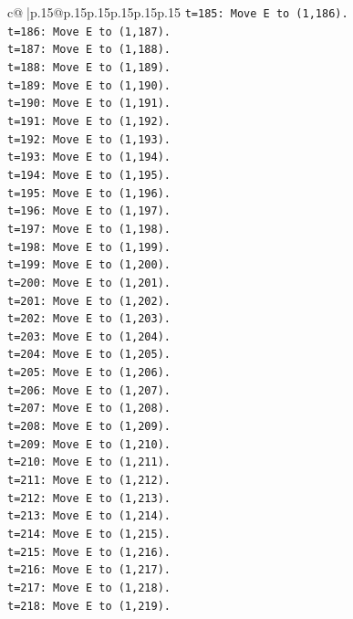 \documentclass{article}
\begin{document}
{\begin{supertabular}{c@{$\;$}|p{.15\linewidth}@{}p{.15\linewidth}p{.15\linewidth}p{.15\linewidth}p{.15\linewidth}p{.15\linewidth}}
{{{\texttt{t=185: Move E to (1,186).} \\
\texttt{t=186: Move E to (1,187).} \\
\texttt{t=187: Move E to (1,188).} \\
\texttt{t=188: Move E to (1,189).} \\
\texttt{t=189: Move E to (1,190).} \\
\texttt{t=190: Move E to (1,191).} \\
\texttt{t=191: Move E to (1,192).} \\
\texttt{t=192: Move E to (1,193).} \\
\texttt{t=193: Move E to (1,194).} \\
\texttt{t=194: Move E to (1,195).} \\
\texttt{t=195: Move E to (1,196).} \\
\texttt{t=196: Move E to (1,197).} \\
\texttt{t=197: Move E to (1,198).} \\
\texttt{t=198: Move E to (1,199).} \\
\texttt{t=199: Move E to (1,200).} \\
\texttt{t=200: Move E to (1,201).} \\
\texttt{t=201: Move E to (1,202).} \\
\texttt{t=202: Move E to (1,203).} \\
\texttt{t=203: Move E to (1,204).} \\
\texttt{t=204: Move E to (1,205).} \\
\texttt{t=205: Move E to (1,206).} \\
\texttt{t=206: Move E to (1,207).} \\
\texttt{t=207: Move E to (1,208).} \\
\texttt{t=208: Move E to (1,209).} \\
\texttt{t=209: Move E to (1,210).} \\
\texttt{t=210: Move E to (1,211).} \\
\texttt{t=211: Move E to (1,212).} \\
\texttt{t=212: Move E to (1,213).} \\
\texttt{t=213: Move E to (1,214).} \\
\texttt{t=214: Move E to (1,215).} \\
\texttt{t=215: Move E to (1,216).} \\
\texttt{t=216: Move E to (1,217).} \\
\texttt{t=217: Move E to (1,218).} \\
\texttt{t=218: Move E to (1,219).} \\
}}}
\end{supertabular}}
\end{document}
